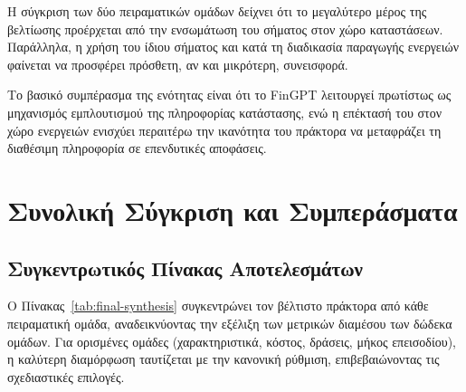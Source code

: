 Η σύγκριση των δύο πειραματικών ομάδων δείχνει ότι το μεγαλύτερο μέρος της βελτίωσης προέρχεται από
την ενσωμάτωση του σήματος στον χώρο καταστάσεων. Παράλληλα, η χρήση του ίδιου σήματος και κατά τη
διαδικασία παραγωγής ενεργειών φαίνεται να προσφέρει πρόσθετη, αν και μικρότερη, συνεισφορά.

Το βασικό συμπέρασμα της ενότητας είναι ότι το FinGPT λειτουργεί πρωτίστως ως μηχανισμός εμπλουτισμού
της πληροφορίας κατάστασης, ενώ η επέκτασή του στον χώρο ενεργειών ενισχύει περαιτέρω την ικανότητα
του πράκτορα να μεταφράζει τη διαθέσιμη πληροφορία σε επενδυτικές αποφάσεις.



\section{Συνολική Σύγκριση και Συμπεράσματα}
\label{sec:exp-synthesis}

\subsection{Συγκεντρωτικός Πίνακας Αποτελεσμάτων}
\label{subsec:exp-final-table}

Ο Πίνακας~\ref{tab:final-synthesis} συγκεντρώνει τον βέλτιστο πράκτορα από κάθε πειραματική ομάδα, αναδεικνύοντας την εξέλιξη των μετρικών διαμέσου των δώδεκα ομάδων. Για ορισμένες ομάδες (χαρακτηριστικά, κόστος, δράσεις, μήκος επεισοδίου), η καλύτερη διαμόρφωση ταυτίζεται με την κανονική ρύθμιση, επιβεβαιώνοντας τις σχεδιαστικές επιλογές.

